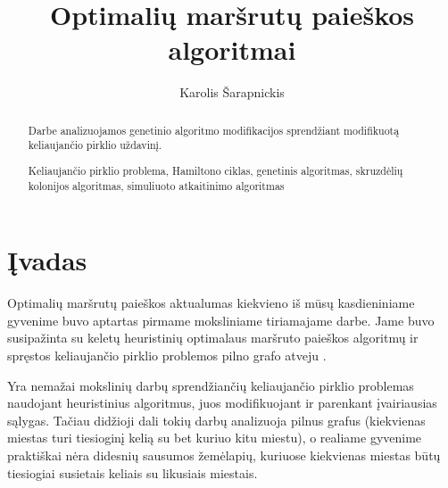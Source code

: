 \documentclass[runningheads,a4paper]{llncs}
\newcommand{\keywords}[1]{\par\addvspace\baselineskip
\noindent\keywordname\enspace\ignorespaces#1}
\begin{document}
\mainmatter  %

\title{Optimalių maršrutų paieškos algoritmai}


%
%
\author{Karolis Šarapnickis}
%


%
%

\maketitle


\begin{abstract}
Darbe analizuojamos genetinio algoritmo modifikacijos sprendžiant modifikuotą keliaujančio pirklio uždavinį.
\keywords{Keliaujančio pirklio problema, Hamiltono ciklas, genetinis algoritmas, skruzdėlių kolonijos algoritmas, simuliuoto atkaitinimo algoritmas}
\end{abstract}


\section{Įvadas}

Optimalių maršrutų paieškos aktualumas kiekvieno iš mūsų kasdieniniame gyvenime buvo aptartas pirmame moksliniame tiriamajame darbe. Jame buvo susipažinta su keletų heuristinių optimalaus maršruto paieškos algoritmų ir spręstos keliaujančio pirklio problemos pilno grafo atveju \cite{mtd1}.

Yra nemažai mokslinių darbų sprendžiančių keliaujančio pirklio problemas naudojant heuristinius algoritmus, juos modifikuojant ir parenkant įvairiausias sąlygas. Tačiau didžioji dali tokių darbų analizuoja pilnus grafus (kiekvienas miestas turi tiesioginį kelią su bet kuriuo kitu miestu), o realiame gyvenime praktiškai nėra didesnių sausumos žemėlapių, kuriuose kiekvienas miestas būtų tiesiogiai susietais keliais su likusiais miestais.
\end{document}
